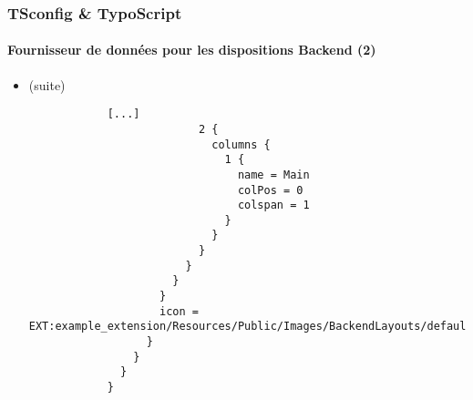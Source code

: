 \begin{frame}[fragile]
	\frametitle{TSconfig \& TypoScript}
	\framesubtitle{Fournisseur de données pour les dispositions Backend (2)}

	\lstset{basicstyle=\tiny\ttfamily}

	\begin{itemize}
		\item \smaller(suite)\normalsize
		\begin{lstlisting}
			[...]
			              2 {
			                columns {
			                  1 {
			                    name = Main
			                    colPos = 0
			                    colspan = 1
			                  }
			                }
			              }
			            }
			          }
			        }
			        icon = EXT:example_extension/Resources/Public/Images/BackendLayouts/default.gif
			      }
			    }
			  }
			}
		\end{lstlisting}
	\end{itemize}

\end{frame}


